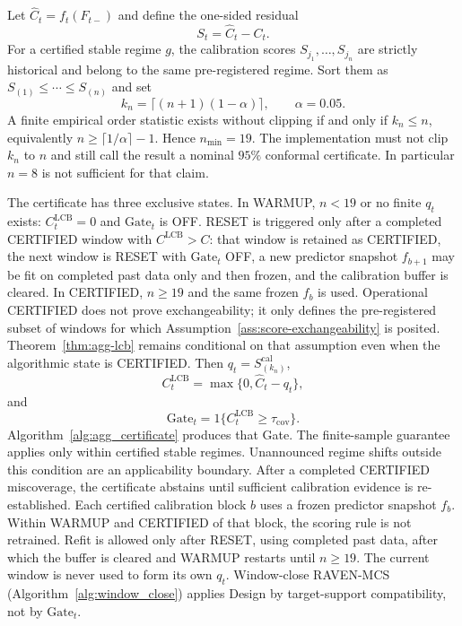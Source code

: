 \documentclass[letterpaper,journal]{IEEEtran}
\begin{document}
Let $\widehat C_t=f_t(F_{t-})$ and define the one-sided residual
\begin{equation}
 S_t=\widehat C_t-C_t.
 \label{eq:agg_St}
\end{equation}
For a certified stable regime $g$, the calibration scores
$S_{j_1},\ldots,S_{j_n}$ are strictly historical and belong to the same
pre-registered regime.  Sort them as $S_{(1)}\le\cdots\le S_{(n)}$ and set
\begin{equation}
 k_n=\lceil(n+1)(1-\alpha)\rceil,
 \qquad
 \alpha=0.05.
 \label{eq:agg_kn}
\end{equation}
A finite empirical order statistic exists without clipping if and only if
$k_n\le n$, equivalently $n\ge\lceil 1/\alpha\rceil-1$.  Hence
$n_{\min}=19$.  The implementation must not clip $k_n$ to $n$ and still call
the result a nominal $95\%$ conformal certificate.  In particular $n=8$ is
not sufficient for that claim.

The certificate has three exclusive states.  In WARMUP, $n<19$ or no
finite $q_t$ exists: $C^{\mathrm{LCB}}_t=0$ and $\mathrm{Gate}_t$ is OFF.
RESET is triggered only after a completed CERTIFIED window with
$C^{\mathrm{LCB}}>C$: that window is retained as CERTIFIED, the next
window is RESET with $\mathrm{Gate}_t$ OFF, a new predictor snapshot
$f_{b+1}$ may be fit on completed past data only and then frozen, and
the calibration buffer is cleared.  In CERTIFIED, $n\ge 19$ and the same frozen
$f_b$ is used.  Operational CERTIFIED does not prove exchangeability; it
only defines the pre-registered subset of windows for which
Assumption~\ref{ass:score-exchangeability} is posited.
Theorem~\ref{thm:agg-lcb} remains conditional on that assumption even when
the algorithmic state is CERTIFIED.  Then $q_t=S_{(k_n)}^{\mathrm{cal}}$,
\begin{equation}
 C^{\mathrm{LCB}}_t=\max\{0,\widehat C_t-q_t\},
 \label{eq:agg_CLCB}
\end{equation}
and
\begin{equation}
 \mathrm{Gate}_t=1\{C^{\mathrm{LCB}}_t\ge\tau_{\mathrm{cov}}\}.
 \label{eq:agg_Gate}
\end{equation}
Algorithm~\ref{alg:agg_certificate} produces that Gate.  The finite-sample
guarantee applies only within certified stable regimes.  Unannounced regime
shifts outside this condition are an applicability boundary.  After a
completed CERTIFIED miscoverage, the certificate abstains until sufficient
calibration evidence is re-established.  Each certified calibration block $b$ uses a frozen
predictor snapshot $f_b$.  Within WARMUP and CERTIFIED of that block, the
scoring rule is not retrained.  Refit is allowed only after RESET, using
completed past data, after which the buffer is cleared and WARMUP restarts
until $n\ge 19$.  The current window is never used to form its own $q_t$.
Window-close RAVEN-MCS (Algorithm~\ref{alg:window_close}) applies Design by
target-support compatibility, not by $\mathrm{Gate}_t$.
\end{document}
